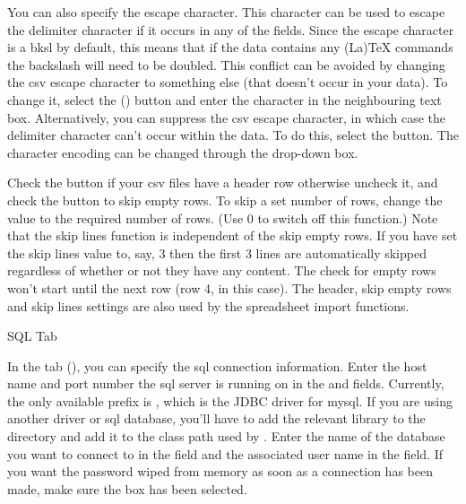      You can also specify the escape character. This character can be used to 
     escape the delimiter character if it occurs in any of the fields. Since the
     escape character is a \gls{bksl} by default, this means
     that if the data contains any (La)TeX commands the backslash will need
     to be doubled. This conflict can be avoided by changing the 
     \gls{csv} escape character to something else (that doesn't occur 
     in your data). To change it, select the () 
      button and enter the
     character in the neighbouring text box. Alternatively, you can suppress 
     the \gls{csv} escape character, in which case the delimiter character can't occur within 
     the data. To do this, select the 
     button.  The character encoding can be changed through the 
      drop-down box.

Check the  button if your 
     \gls{csv} files have a header row otherwise uncheck it, and
     check the  button
     to skip empty rows. To skip a set number of rows, change the
      value to the required number 
     of rows. (Use 0 to switch off this function.) Note that the skip lines
     function is independent of the skip empty rows. If you have set the 
     skip lines value to, say, 3 then the first 3 lines are automatically 
     skipped regardless of whether or not they have any content. The check for 
     empty rows won't start until the next row (row 4, in this case).
     The header, skip empty rows and skip lines settings are also used by
     the spreadsheet import functions.


 {%
 }
 {SQL Tab}

In the  tab (), you can specify the \gls{sql} connection information.
Enter the host name and port number the \gls{sql} server is 
running on in the  and 
 fields. Currently, the only
available prefix is , which is the JDBC driver for
\gls{mysql}. If you are using another driver or \gls{sql} 
database, you'll have to add the relevant library to the 
directory and add it to the class path used by .
Enter the name of the database you want to connect to in the 
 field and the associated
user name in the  field.
If you want the password wiped from memory as soon as a connection
has been made, make sure the 
box has been selected.

